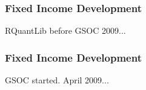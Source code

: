 \documentclass[compress]{beamer}
\begin{document}
\begin{frame}
	\frametitle{Fixed Income Development}
	RQuantLib before GSOC 2009...
	\begin{center}
	\end{center}
\end{frame}
\begin{frame}
	\frametitle{Fixed Income Development}
	GSOC started. April 2009...
	\begin{center}
	\end{center}
\end{frame}
\end{document}
